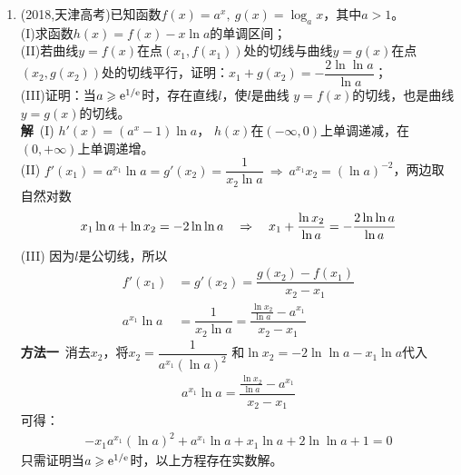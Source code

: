 \begin{enumerate}[label={【\textbf{例\thechapter.\arabic*}】},
 leftmargin=\inteval{\myenumleftmargin}pt,
 itemsep=\inteval{\myenumitempsep}pt,
 itemindent=\inteval{\myenumitemindent}pt]
因为$ \dfrac{p}{q}-x_0\neq 0 $，所以$ |2p^4+3p^3q-3p^2q^2-
6pq^3+aq^4|>0 $，又因为$ p,q $为正整数，所以
$ |2p^4+3p^3q-3p^2q^2-6pq^3+aq^4| $也是正整数，
那么它必然大于等于1，
\begin{gather*}
    \left|\frac{p}{q}-x_0\right|>\frac{1}{f'(2)q^4}
\end{gather*}
只需令$ A=|f'(2)| $，就有$ \left|\dfrac{p}{q}-x_0\right|>\dfrac{1}{Aq^4} $.\\
\textbf{注}：第(2)问实际上是拉格朗日中值定理，设$ m\in[1,x_0) $，做逆向分析，
有$ h(m)=\varphi_1(m)>0 $，$ h(x_0)=\varphi_2(m)<0 $，$ f'(x_0)(m-x_0)<f(m)
<f'(m)(m-x_0) $，即
\begin{gather}
    f'(x_0)<\frac{f(m)-f(x_0)}{m-x_0}=f'(\xi)<f'(m)
\end{gather}
因为$ f'(x) $在$ \Big(\dfrac{1}{4},+\infty\Big) $上单调递增，
所以上式显然成立。

第(3)问实际上是刘维尔逼近定理。

\item (2018,天津高考)已知函数$ f(x)=a^x,\ g(x)=\log_{a} x $，其中$ a>1 $。\\
(I)求函数$ h(x)=f(x)-x\ln a $的单调区间；\\
(II)若曲线$ y=f(x) $在点$ (x_1,f(x_1)) $处的切线与曲线$ y=g(x) $在点
$ (x_2,g(x_2)) $处的切线平行，证明：$ x_1+g(x_2)=
-\dfrac{2\ln\ln a}{\ln a} $；\\
(III)证明：当$ a\geqslant \mathrm{e}^{1/\mathrm{e}} $时，存在直线$ l $，使$ l $是曲线
$ y=f(x) $的切线，也是曲线$ y=g(x) $的切线。\\
\textbf{解}\ (I) $ h'(x)=(a^x-1)\ln a $，
$ h(x) $在$ (-\infty,0) $上单调递减，在$ (0,+\infty) $上单调递增。\\
(II) $ f'(x_1)=a^{x_1}\ln a=g'(x_2)=\dfrac{1}{x_2\ln a}\
\Rightarrow \  a^{x_1}x_2=(\ln a)^{-2} $，两边取自然对数
\begin{gather*}
    x_1\ln a+\ln x_2=-2\ln\ln a\quad \Rightarrow \quad 
    x_1+\frac{\ln x_2}{\ln a}=-\dfrac{2\ln\ln a}{\ln a}
\end{gather*}
(III) 因为$ l $是公切线，所以
\begin{align*}
    f'(x_1) &=g'(x_2)=\dfrac{g(x_2)-f(x_1)}{x_2-x_1} \\
    a^{x_1}\ln a &=\dfrac{1}{x_2\ln a}=\dfrac{\frac{\ln x_2}{\ln a}
        -a^{x_1}}{x_2-x_1}
\end{align*}
\textbf{方法一}\ 消去$ x_2 $，将$ x_2=\dfrac{1}{a^{x_1}(\ln a)^2} $
和$ \ln x_2=-2\ln\ln a-x_1\ln a $代入
\begin{gather*}
    a^{x_1}\ln a =\dfrac{\frac{\ln x_2}{\ln a}-a^{x_1}}{x_2-x_1}
\end{gather*}
可得：
\begin{gather*}
    -x_1a^{x_1}(\ln a)^2+a^{x_1}\ln a +x_1\ln a+2\ln\ln a+1=0
\end{gather*}
只需证明当$ a\geqslant \mathrm{e}^{1/\mathrm{e}} $时，以上方程存在实数解。


\end{enumerate}
